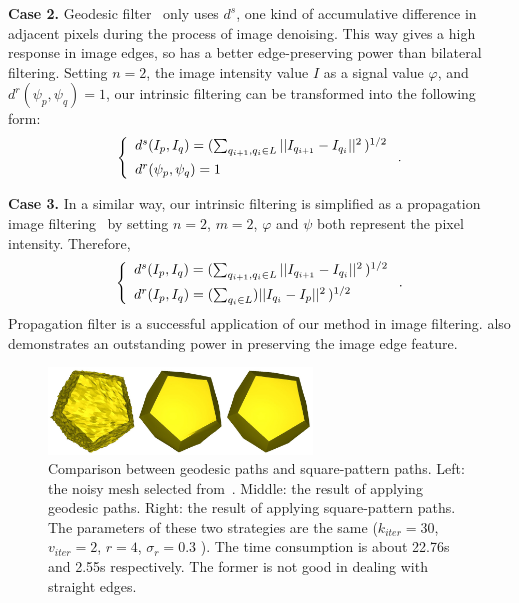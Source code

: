 {\bfseries Case 2.}
Geodesic filter~\cite{grazzini2009edge} only uses $d^s$, one kind of accumulative difference in adjacent pixels during the process of image denoising.
This way gives a high response in image edges, so has a better edge-preserving power than bilateral filtering.
Setting $n=2$, the image intensity value $I$ as a signal value $\varphi$, and $d^{r}(\psi_p, \psi_q) = 1$,
our intrinsic filtering can be transformed into the following form:
 \begin{equation}
 \label{Eq:GeodesicDistance}
 \left \{
 \begin{array}{ll}
        d^{s}(I_p,I_q) = (\sum_{q_{i+1}, q_i \in{L}}||I_{q_{i+1}} - I_{q_i}||^{2}\,)^{1/2} \vspace{1.5mm} \\
        d^{r}(\psi_p, \psi_q) = 1 \\
 \end{array}
 \right. .
 \end{equation}

{\bfseries Case 3.}
In a similar way, our intrinsic filtering is simplified as a propagation image filtering~\cite{Chang2015propagated}
by setting $n=2$, $m=2$, $\varphi$ and $\psi$ both represent the pixel intensity.
Therefore,
 \begin{equation}
 \label{Eq:PropagationDistance}
 \left \{
 \begin{array}{ll}
        d^{s}(I_p, I_q) = (\sum_{q_{i+1}, q_i \in{L}}||I_{q_{i+1}} - I_{q_i}||^{2}\,)^{1/2} \vspace{1.5mm}\\
        d^{r}(I_p, I_q) = (\sum_{{q_i} \in{L}})||I_{q_i} - I_p||^2\,)^{1/2} \\
 \end{array}
 \right. .
 \end{equation}
Propagation filter \cite{Chang2015propagated} is a successful application of our method in image filtering.
\cite{Chang2015propagated} also demonstrates an outstanding power in preserving the image edge feature.


\begin{figure}
\centering
\includegraphics[width = 7.0cm]{results/shortest/shortest.jpg}
\vspace{-0.5mm}
\caption{ Comparison between geodesic paths and square-pattern paths. Left: the noisy mesh selected from~\cite{Wang2014decoupling}. Middle: the result of applying geodesic paths. Right: the result of applying square-pattern paths. The parameters of these two strategies are the same ($k_{iter} = 30$, $v_{iter} = 2$, $r = 4$, $\sigma_r = 0.3$ ). The time consumption is about 22.76s and 2.55s respectively. The former is not good in dealing with straight edges.}
\label{Fig:shortestpath}
\end{figure}


